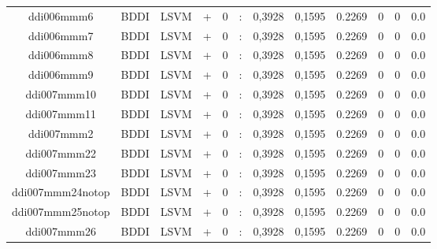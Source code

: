 \documentclass[a4paper]{article}
\begin{document}
\begin{landscape}
\begin{center}
\begin{tabular}{ |c|c|c|c|c|c|c|c|c|c|c|c|}
 
 	
 	\small{ ddi006mmm6 } & BDDI & LSVM & +  &  0 &  :  &  0,3928 & 0,1595 & 0.2269  &  0 & 0 & 0.0 \\
 	

 
 	
 	\small{ ddi006mmm7 } & BDDI & LSVM & +  &  0 &  :  &  0,3928 & 0,1595 & 0.2269  &  0 & 0 & 0.0 \\
 	

 
 	
 	\small{ ddi006mmm8 } & BDDI & LSVM & +  &  0 &  :  &  0,3928 & 0,1595 & 0.2269  &  0 & 0 & 0.0 \\
 	

 
 	
 	\small{ ddi006mmm9 } & BDDI & LSVM & +  &  0 &  :  &  0,3928 & 0,1595 & 0.2269  &  0 & 0 & 0.0 \\
 	

 
 	
 	\small{ ddi007mmm10 } & BDDI & LSVM & +  &  0 &  :  &  0,3928 & 0,1595 & 0.2269  &  0 & 0 & 0.0 \\
 	

 
 	
 	\small{ ddi007mmm11 } & BDDI & LSVM & +  &  0 &  :  &  0,3928 & 0,1595 & 0.2269  &  0 & 0 & 0.0 \\
 	

 
 	
 	\small{ ddi007mmm2 } & BDDI & LSVM & +  &  0 &  :  &  0,3928 & 0,1595 & 0.2269  &  0 & 0 & 0.0 \\
 	

 
 	
 	\small{ ddi007mmm22 } & BDDI & LSVM & +  &  0 &  :  &  0,3928 & 0,1595 & 0.2269  &  0 & 0 & 0.0 \\
 	

 
 	
 	\small{ ddi007mmm23 } & BDDI & LSVM & +  &  0 &  :  &  0,3928 & 0,1595 & 0.2269  &  0 & 0 & 0.0 \\
 	

 
 	
 	\small{ ddi007mmm24notop } & BDDI & LSVM & +  &  0 &  :  &  0,3928 & 0,1595 & 0.2269  &  0 & 0 & 0.0 \\
 	

 
 	
 	\small{ ddi007mmm25notop } & BDDI & LSVM & +  &  0 &  :  &  0,3928 & 0,1595 & 0.2269  &  0 & 0 & 0.0 \\
 	

 
 	
 	\small{ ddi007mmm26 } & BDDI & LSVM & +  &  0 &  :  &  0,3928 & 0,1595 & 0.2269  &  0 & 0 & 0.0 \\
 	


\end{tabular}
\end{center}
\end{landscape}
\end{document}
